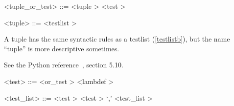 
\label{tuplezzzorzzztestb}

\begin{grammar}
<tuple_or_test> ::= <tuple \myref[tupleb]>
	\alt <test \myref[testb]>
\end{grammar}


\label{tupleb}

\begin{grammar}
<tuple> ::= <testlist \myref[testlistb]>
\end{grammar}


A tuple has the same syntactic rules as a testlist (\ref{testlistb}), but the name ``tuple'' is more descriptive sometimes.

\label{testb}

See the Python reference~\cite{pythonlang}, section 5.10.

\begin{grammar}
<test> ::= <or_test \myref[orzzztestb]>
	\alt <lambdef \myref[lambdefb]>
\end{grammar}


\label{testzzzlistb}

\begin{grammar}
<test_list> ::= \greeke
	\alt <test \myref[testb]>
	\alt <test \myref[testb]> `,' <test_list \myref[testzzzlistb]>
\end{grammar}

